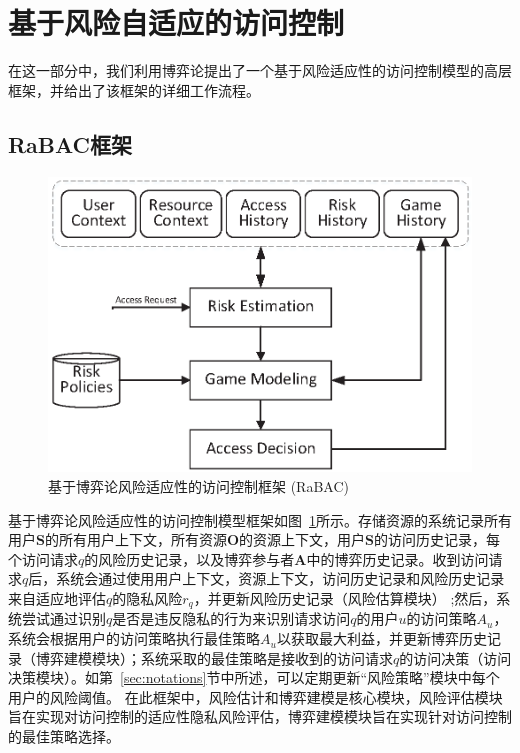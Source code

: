 \section{基于风险自适应的访问控制}
\label{sec:framework}


在这一部分中，我们利用博弈论提出了一个基于风险适应性的访问控制模型的高层框架，并给出了该框架的详细工作流程。
\subsection{RaBAC框架}
\label{sec:hlframework}

\begin{figure}[htb]
	\centering
	\includegraphics[width=.85\textwidth]{./figures/game-rbac-framework.eps}
	\caption{基于博弈论风险适应性的访问控制框架 (RaBAC)}\label{fig:game-rbac-framework}
\end{figure}



基于博弈论风险适应性的访问控制模型框架如图~\ref{fig:game-rbac-framework}所示。存储资源的系统记录所有用户$\mathbf{S}$的所有用户上下文，所有资源$\mathbf{O}$的资源上下文，用户$\mathbf{S}$的访问历史记录，每个访问请求$q$的风险历史记录，以及博弈参与者$\mathbf{A}$中的博弈历史记录。收到访问请求$q$后，系统会通过使用用户上下文，资源上下文，访问历史记录和风险历史记录来自适应地评估$q$的隐私风险$r_q$，并更新风险历史记录（风险估算模块） ;然后，系统尝试通过识别$q$是否是违反隐私的行为来识别请求访问$q$的用户$u$的访问策略$A_u$，系统会根据用户的访问策略执行最佳策略$A_u$以获取最大利益，并更新博弈历史记录（博弈建模模块）；系统采取的最佳策略是接收到的访问请求$q$的访问决策（访问决策模块）。如第~\ref{sec:notations}节中所述，可以定期更新“风险策略”模块中每个用户的风险阈值。
在此框架中，风险估计和博弈建模是核心模块，风险评估模块旨在实现对访问控制的适应性隐私风险评估，博弈建模模块旨在实现针对访问控制的最佳策略选择。


